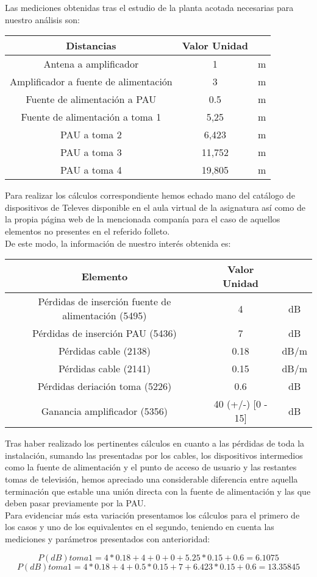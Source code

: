 \documentclass{article}[12 pt]
\begin{document}
		Las mediciones obtenidas tras el estudio de la planta acotada necesarias para nuestro análisis son:

		\begin{tabular}{| c | c | c |}
			\hline
			\textbf{Distancias} & \textbf{Valor} \textbf{Unidad}\\
			\hline
			Antena a amplificador & 1 & m\\
			\hline
			Amplificador a fuente de alimentación & 3 & m\\
			\hline
			Fuente de alimentación a PAU & 0.5 & m\\
			\hline
			Fuente de alimentación a toma 1 & 5,25 & m\\
			\hline
			PAU a toma 2 & 6,423 & m\\
			\hline
			PAU a toma 3 & 11,752 & m\\
			\hline
			PAU a toma 4  & 19,805 & m\\
			\hline
		\end{tabular}

		Para realizar los cálculos correspondiente hemos echado mano del catálogo de dispositivos de Televes disponible en el aula virtual de la asignatura así como de la propia página web de la mencionada companía para el caso de aquellos elementos no presentes en el referido folleto.\\

		De este modo, la información de nuestro interés obtenida es:

		\begin{tabular}{| c | c | c |}
			\hline
			\textbf{Elemento} & \textbf{Valor} \textbf{Unidad}\\
			\hline
			Pérdidas de inserción fuente de alimentación (5495) & 4 & dB\\
			\hline
			Pérdidas de inserción PAU (5436) & 7 & dB\\
			\hline
			Pérdidas cable (2138) & 0.18 & dB/m\\
			\hline
			Pérdidas cable (2141) & 0.15 & dB/m\\
			\hline
			Pérdidas deriación toma (5226) & 0.6 & dB\\
			\hline
			Ganancia amplificador (5356) & 40 (+/-) [0 - 15] & dB\\
			\hline
		\end{tabular}

		Tras haber realizado los pertinentes cálculos en cuanto a las pérdidas de toda la instalación, sumando las presentadas por los cables, los dispositivos intermedios como la fuente de alimentación y el punto de acceso de usuario y las restantes tomas de televisión, hemos apreciado una considerable diferencia entre aquella terminación que estable una unión directa con la fuente de alimentación y las que deben pasar previamente por la PAU.\\

		Para evidenciar más esta variación presentamos los cálculos para el primero de los casos y uno de los equivalentes en el segundo, teniendo en cuenta las mediciones y parámetros presentados con anterioridad:

		$$P(dB)toma1 = 4*0.18 + 4 + 0 + 0 + 5.25*0.15 + 0.6 = 6.1075$$
		$$P(dB)toma1 = 4*0.18 + 4 + 0.5*0.15 + 7 + 6.423*0.15 + 0.6 = 13.35845$$
\end{document}
